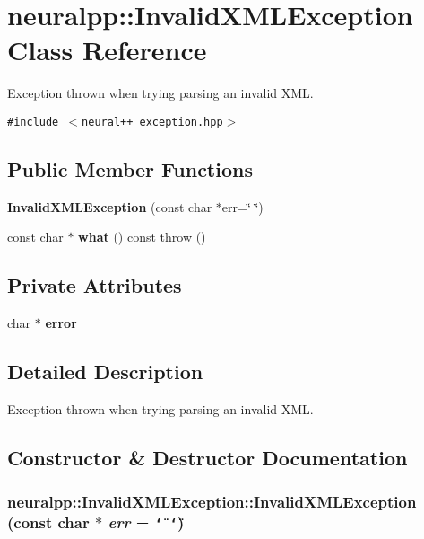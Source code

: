 \section{neuralpp::InvalidXMLException Class Reference}
\label{classneuralpp_1_1InvalidXMLException}
Exception thrown when trying parsing an invalid XML.  


{\tt \#include $<$neural++\_\-exception.hpp$>$}

\subsection*{Public Member Functions}
\begin{CompactItemize}
\item 
{\bf InvalidXMLException} (const char $\ast$err=\char`\"{} \char`\"{})
\item 
const char $\ast$ {\bf what} () const   throw ()
\end{CompactItemize}
\subsection*{Private Attributes}
\begin{CompactItemize}
\item 
char $\ast$ {\bf error}
\end{CompactItemize}


\subsection{Detailed Description}
Exception thrown when trying parsing an invalid XML. 

\subsection{Constructor \& Destructor Documentation}
\subsubsection[InvalidXMLException]{\setlength{\rightskip}{0pt plus 5cm}neuralpp::InvalidXMLException::InvalidXMLException (const char $\ast$ {\em err} = {\tt \char`\"{}~\char`\"{}})\hspace{0.3cm}{\tt  [inline]}}\label{classneuralpp_1_1InvalidXMLException_793d311be88606908abf8c5be1348586}




